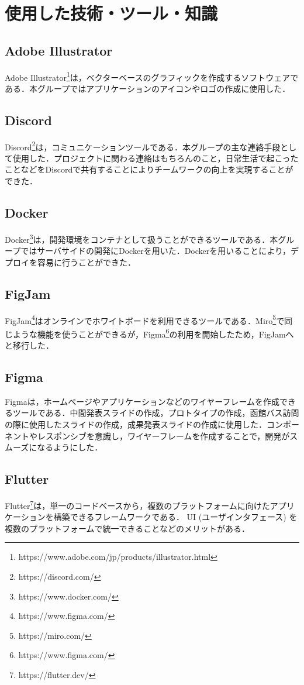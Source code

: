 \chapter{使用した技術・ツール・知識}

\section{Adobe Illustrator}
Adobe Illustrator\footnote{https://www.adobe.com/jp/products/illustrator.html}は，ベクターベースのグラフィックを作成するソフトウェアである．本グループではアプリケーションのアイコンやロゴの作成に使用した．

\section{Discord}
Discord\footnote{https://discord.com/}は，コミュニケーションツールである．本グループの主な連絡手段として使用した．プロジェクトに関わる連絡はもちろんのこと，日常生活で起こったことなどをDiscordで共有することによりチームワークの向上を実現することができた．

\section{Docker}
Docker\footnote{https://www.docker.com/}は，開発環境をコンテナとして扱うことができるツールである．本グループではサーバサイドの開発にDockerを用いた．Dockerを用いることにより，デプロイを容易に行うことができた．

\section{FigJam}
FigJam\footnote{https://www.figma.com/}はオンラインでホワイトボードを利用できるツールである．Miro\footnote{https://miro.com/}で同じような機能を使うことができるが，Figma\footnote{https://www.figma.com/}の利用を開始したため，FigJamへと移行した．

\section{Figma}
Figmaは，ホームページやアプリケーションなどのワイヤーフレームを作成できるツールである．中間発表スライドの作成，プロトタイプの作成，函館バス訪問の際に使用したスライドの作成，成果発表スライドの作成に使用した．コンポーネントやレスポンシブを意識し，ワイヤーフレームを作成することで，開発がスムーズになるようにした．

\section{Flutter}
Flutter\footnote{https://flutter.dev/}は，単一のコードベースから，複数のプラットフォームに向けたアプリケーションを構築できるフレームワークである．
UI (ユーザインタフェース) を複数のプラットフォームで統一できることなどのメリットがある．

